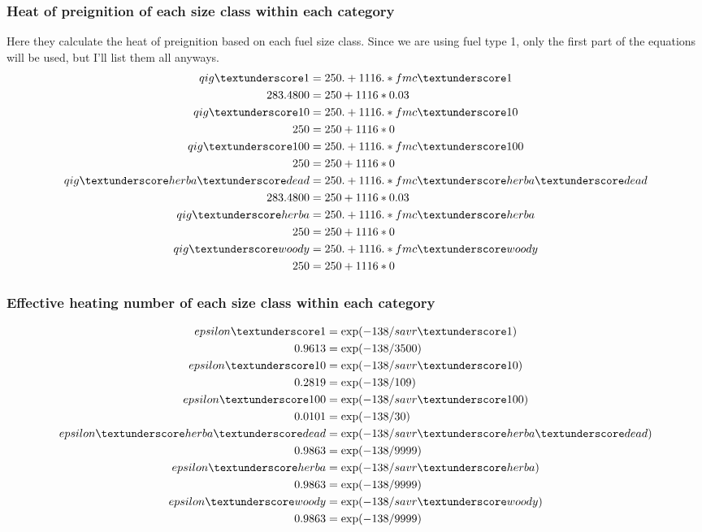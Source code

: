 \documentclass{article}
\newcommand\und{\textunderscore}
\begin{document}
\subsubsection{Heat of preignition of each size class within each category}
Here they calculate the heat of preignition based on each fuel size class. Since we are using fuel type 1, only the first part of the equations will be used, but I'll list them all anyways. 
\begin{equation}
\label{qig_WFA}
	\begin{split}
	qig\und 1         &= 250. + 1116.*fmc\und 1 \\
	283.4800 &= 250 + 1116 * 0.03 \\
qig\und 10        &= 250. + 1116.*fmc\und 10 \\
250 &= 250 + 1116 * 0 \\
qig\und 100       &= 250. + 1116.*fmc\und 100 \\
250 &= 250 + 1116 * 0 \\
qig\und herba\und dead &= 250. + 1116.*fmc\und herba\und dead \\
283.4800 &= 250 + 1116 * 0.03 \\
qig\und herba     &= 250. + 1116.*fmc\und herba \\
250 &= 250 + 1116 * 0 \\
qig\und woody     &= 250. + 1116.*fmc\und woody \\
250 &= 250 + 1116 * 0 
\end{split}
\end{equation}

\subsubsection{Effective heating number of each size class within each category}
\begin{equation}
	\begin{split}
	epsilon\und 1          &= \exp(-138 / savr\und 1) \\
		0.9613 &= \exp (-138 / 3500) \\
	epsilon\und 10         &= \exp(-138 / savr\und 10) \\
		0.2819 &= \exp (-138 / 109) \\
	epsilon\und 100        &= \exp(-138 / savr\und 100) \\
		0.0101 &= \exp (-138 / 30) \\
	epsilon\und herba\und dead &= \exp(-138 / savr\und herba\und dead) \\
		0.9863 &= \exp (-138 / 9999) \\
	epsilon\und herba      &= \exp(-138 / savr\und herba) \\
		0.9863 &= \exp (-138 / 9999) \\
	epsilon\und woody      &= \exp(-138 / savr\und woody) \\
		0.9863 &= \exp (-138 / 9999) 
	\end{split}
\end{equation}
\end{document}
